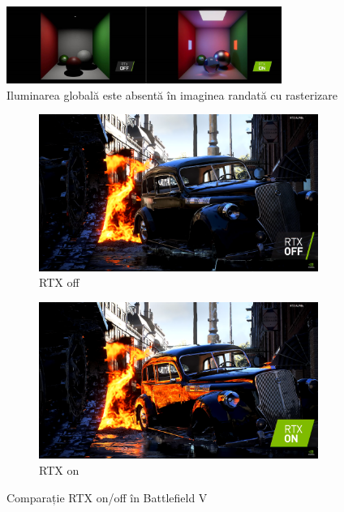 \documentclass[12pt,a4paper]{report}
\numberwithin{equation}{section} %
\begin{document}
\begin{figure}[ht]
	\centering
	\includegraphics[width=0.8\textwidth]{pics/cornell-raster.jpg}
	\caption{Iluminarea globală este absentă în imaginea randată cu rasterizare\protect\footnotemark}
	\vspace{1cm}
	\label{fig:cornell-raster}
\end{figure}

\begin{figure}[ht]
	\centering
	\begin{subfigure}[h]{0.45\linewidth}
		\centering
		\includegraphics[width=\linewidth]{pics/bf5-rtx-off.png}
		\caption{RTX off}
	\end{subfigure}
	\hfill
	\begin{subfigure}[h]{0.45\linewidth}
		\centering
		\includegraphics[width=\linewidth]{pics/bf5-rtx-on.png}
		\caption{RTX on}
	\end{subfigure}
	\caption{Comparație RTX on/off în Battlefield V\protect\footnotemark}
	\label{fig:bf5-rtx}
\end{figure}
\end{document}
